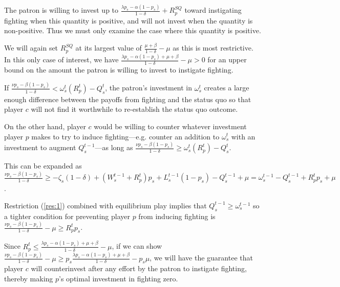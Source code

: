 \documentclass[11pt,letterpaper, notitlepage]{article}
\newcommand{\de}{\delta}
\begin{document}
The patron is willing to invest up to $\frac{\lambda p_s - \alpha (1-p_s)}{1 -\de} +R_p^{SQ}$ toward instigating fighting when this quantity is positive, and will not invest when the quantity is non-positive. Thus we must only examine the case where this quantity is positive.

We will again set $R_p^{SQ}$ at its largest value of $\frac{\mu + \beta}{1-\de} -\mu$ as this is most restrictive. In this only case of interest, we have $\frac{\lambda p_s - \alpha (1-p_s) + \mu + \beta}{1 - \de} -\mu> 0$ for an upper bound on the amount the patron is willing to invest to instigate fighting.

If $\frac{\nu p_s - \beta (1-p_s)}{1 -\de}  < \omega_s^t\left(R_p^t\right) - Q_s^t$, the patron's investment in $\omega_s^t$ creates a large enough difference between the payoffs from fighting and the status quo so that player $c$ will not find it worthwhile to re-establish the status quo outcome.

On the other hand, player $c$ would be willing to counter whatever investment player $p$ makes to try to induce fighting---e.g. counter an addition to $\omega_s^t$ with an investment to augment $Q_s^{t-1}$---as long as $\frac{\nu p_s - \beta (1-p_s)}{1 -\de}  \geq \omega_s^t\left(R_p^t\right) - Q_s^t$.

This can be expanded as $\frac{\nu p_s - \beta (1-p_s)}{1 -\de}  \geq -\zeta_{s}(1-\de) + (W_s^{t-1}+R_p^t)p_s + L_s^{t-1}(1-p_s) - Q_s^{t-1} +\mu = \omega_s^{t-1} - Q_s^{t-1} +R_p^t p_s + \mu$. 

Restriction (\ref{res:1}) combined with equilibrium play implies that  $Q_s^{t-1} \geq \omega_s^{t-1}$ so a tighter condition for preventing player $p$ from inducing fighting is $\frac{\nu p_s - \beta (1-p_s)}{1 -\de} - \mu \geq R_p^t p_s$. 

Since $R_p^t \leq \frac{\lambda p_s - \alpha (1-p_s) + \mu + \beta}{1 - \de} -\mu$, if we can show $\frac{\nu p_s - \beta (1-p_s)}{1 -\de}  - \mu \geq p_s \frac{\lambda p_s - \alpha (1-p_s) + \mu + \beta}{1 - \de} - p_s \mu$, we will have the guarantee that player $c$ will counterinvest after any effort by the patron to instigate fighting, thereby making $p$'s optimal investment in fighting zero.
\end{document}
